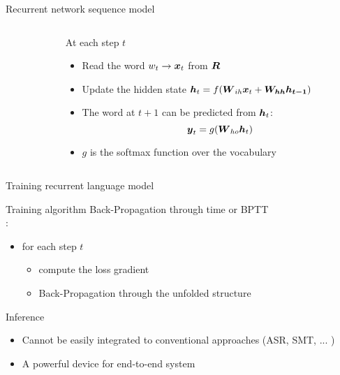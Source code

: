 \begin{frame}{Recurrent network sequence model}
\begin{columns}
\begin{column}{0.5\textwidth}
\begin{center}
\begin{tikzpicture}[scale=0.6,every node/.style={scale=0.7}]
        \end{tikzpicture}
      \end{center}
    \end{column}
    \begin{column}{0.5\textwidth}
      At each step $t$
      \begin{itemize}
      \item Read the word $w_t \rightarrow \x_t$ from $\seq{R}$
      \item Update the hidden state $\seq{h}_t = f(\seq{W}_{ih} \x_t + \seq{W_{hh}\seq{h}_{t-1}})$
      \item The word at $t+1$ can be predicted from $\seq{h}_t$:
        $$
        \seq{y}_t = g(\seq{W}_{ho} \seq{h}_t)
        $$
      \item $g$ is the softmax function over the vocabulary
      \end{itemize}
    \end{column}
  \end{columns}
\end{frame}



\begin{frame}{Training recurrent language model}
  \begin{block}{Training algorithm}
    Back-Propagation through time or
    BPTT\\\cite{Rumelhart86BPTT,Mikolov11Extension}:\\
    \begin{itemize}
    \item for each step $t$
      \begin{itemize}
      \item compute the loss gradient
      \item Back-Propagation through the unfolded structure
      \end{itemize}
    \end{itemize}
  \end{block}
  \begin{block}{Inference}
    \begin{itemize}
    \item Cannot be easily integrated to conventional approaches (ASR, SMT, ... )
    \item A powerful device for end-to-end system
    \end{itemize}
  \end{block}
\end{frame}

